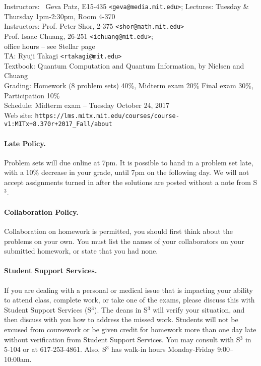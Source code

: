 \documentclass[preprint,pra,12pt]{ikedoc3}
\begin{document}
\begin{tabbing}
Instructors:~ \= Geva Patz, E15-435 {\tt <geva@media.mit.edu>}; \kill
Lectures: \> Tuesday \& Thursday 1pm-2:30pm, Room 4-370 \\
Instructors: \> Prof. Peter Shor, 2-375 {\tt <shor@math.mit.edu>}  \\
             \> Prof. Isaac Chuang, 26-251 {\tt <ichuang@mit.edu>};   \\
	\> office hours -- see Stellar page
\\
TA: \>  Ryuji Takagi {\tt <rtakagi@mit.edu>}\\
Textbook: \> Quantum Computation and Quantum Information, by Nielsen and Chuang
\\
Grading: \> Homework (8 problem sets) 40\%, Midterm exam 20\%
	    Final exam 30\%, Participation 10\%
\\
Schedule: \> Midterm exam -- Tuesday October 24, 2017
\\
Web site: \> {\tt https://lms.mitx.mit.edu/courses/course-v1:MITx+8.370r+2017\_Fall/about}
\end{tabbing}

\paragraph{Late Policy.} Problem sets will due online at 7pm.
It is possible to hand in a problem set late, with a 10\% decrease 
in your grade, until 7pm on the following day. 
We will not accept assignments turned in after the 
solutions are posted without a note from S$^3$.

\paragraph{Collaboration Policy.} Collaboration on homework is permitted, 
you should first think about the problems on your own. 
You must list the names of your collaborators on your submitted homework, 
or state that you had none. 

\paragraph{Student Support Services.} If you are dealing with a 
personal or medical issue that is impacting your ability to attend 
class, complete work, or take one of the exams, please discuss this 
with Student Support Services (S$^3$). The deans in S$^3$ will 
verify your situation, and then discuss with you how to address the
missed work. Students will not be excused from coursework or be 
given credit for homework more than one day late without verification 
from Student Support Services. You may consult with S$^3$  in 5-104 or 
at 617-253-4861. Also, S$^3$ has walk-in hours Monday-Friday 9:00--10:00am.
\end{document}
